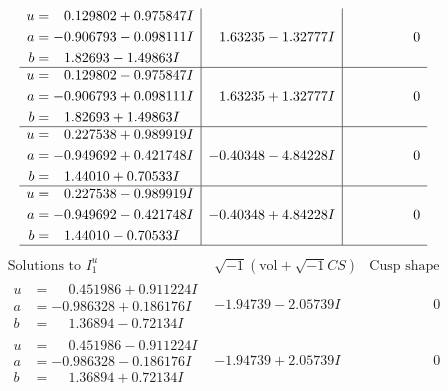 \documentclass[1p]{elsarticle_modified}
\theoremstyle{definition}
\newcommand{\I}{\sqrt{-1}}
\begin{document}
$$\begin{array}{c|c|c}
\begin{aligned}
u &= \phantom{-}0.129802 + 0.975847 I \\
a &= -0.906793 - 0.098111 I \\
b &= \phantom{-}1.82693 - 1.49863 I\end{aligned}
 & \phantom{-}1.63235 - 1.32777 I & \phantom{-0.000000 } 0 \\ \hline\begin{aligned}
u &= \phantom{-}0.129802 - 0.975847 I \\
a &= -0.906793 + 0.098111 I \\
b &= \phantom{-}1.82693 + 1.49863 I\end{aligned}
 & \phantom{-}1.63235 + 1.32777 I & \phantom{-0.000000 } 0 \\ \hline\begin{aligned}
u &= \phantom{-}0.227538 + 0.989919 I \\
a &= -0.949692 + 0.421748 I \\
b &= \phantom{-}1.44010 + 0.70533 I\end{aligned}
 & -0.40348 - 4.84228 I & \phantom{-0.000000 } 0 \\ \hline\begin{aligned}
u &= \phantom{-}0.227538 - 0.989919 I \\
a &= -0.949692 - 0.421748 I \\
b &= \phantom{-}1.44010 - 0.70533 I\end{aligned}
 & -0.40348 + 4.84228 I & \phantom{-0.000000 } 0\\
 \hline 
 \end{array}$$\newpage$$\begin{array}{c|c|c}  
\text{Solutions to }I^u_{1}& \I (\text{vol} + \sqrt{-1}CS) & \text{Cusp shape}\\
 \hline 
\begin{aligned}
u &= \phantom{-}0.451986 + 0.911224 I \\
a &= -0.986328 + 0.186176 I \\
b &= \phantom{-}1.36894 - 0.72134 I\end{aligned}
 & -1.94739 - 2.05739 I & \phantom{-0.000000 } 0 \\ \hline\begin{aligned}
u &= \phantom{-}0.451986 - 0.911224 I \\
a &= -0.986328 - 0.186176 I \\
b &= \phantom{-}1.36894 + 0.72134 I\end{aligned}
 & -1.94739 + 2.05739 I & \phantom{-0.000000 } 0 \\ \hline\begin{aligned}

\end{aligned}
\end{array}$$
\end{document}
